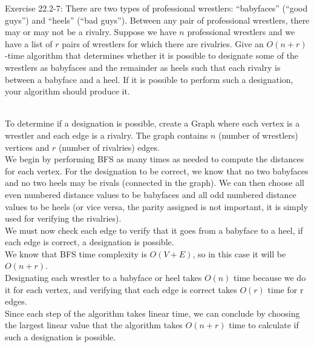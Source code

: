 \documentclass[addpoints,11pt]{exam}
\begin{document}
\begin{questions}
\question[5] Exercise 22.2-7:  There are two types of professional wrestlers: ``babyfaces'' (``good guys'') and ``heels'' (``bad guys'').  Between any pair of professional wrestlers, there may or may not be a rivalry.  Suppose we have $n$ professional wrestlers and we have a list of $r$ pairs of wrestlers for which there are rivalries.  Give an $O(n+r)$-time algorithm that determines whether it is possible to designate some of the wrestlers as babyfaces and the remainder as heels such that each rivalry is between a babyface and a heel.  If it is possible to perform such a designation, your algorithm should produce it.
\begin{solutionorbox} \\
	To determine if a designation is possible, create a Graph where each vertex is a wrestler and each edge is a rivalry. The graph contains $n$ (number of wrestlers) vertices and $r$ (number of rivalries) edges. \\
	We begin by performing BFS as many times as needed to compute the distances for each vertex. For the designation to be correct, we know that no two babyfaces and no two heels may be rivals (connected in the graph). We can then choose all even numbered distance values to be babyfaces and all odd numbered distance values to be heels (or vice versa, the parity assigned is not important, it is simply used for verifying the rivalries). \\
	We must now check each edge to verify that it goes from a babyface to a heel, if each edge is correct, a designation is possible. \\
	We know that BFS time complexity is $O(V + E)$, so in this case it will be $O(n + r)$. \\
	Designating each wrestler to a babyface or heel takes $O(n)$ time because we do it for each vertex, and verifying that each edge is correct takes $O(r)$ time for r edges. \\
	Since each step of the algorithm takes linear time, we can conclude by choosing the largest linear value that the algorithm takes $O(n + r)$ time to calculate if such a designation is possible.
\end{solutionorbox}

\ifprintanswers
\newpage
\else
\bigskip
\fi




\end{questions}
\end{document}
